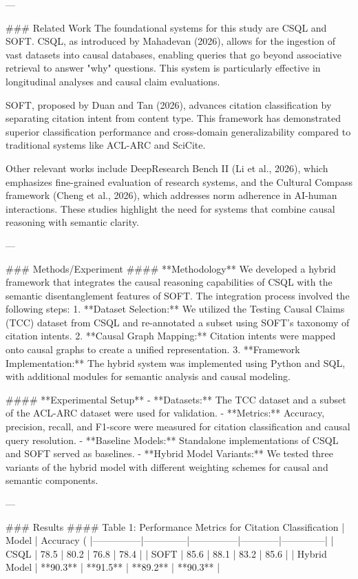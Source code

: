 ---

### Related Work
The foundational systems for this study are CSQL and SOFT. CSQL, as introduced by Mahadevan (2026), allows for the ingestion of vast datasets into causal databases, enabling queries that go beyond associative retrieval to answer "why" questions. This system is particularly effective in longitudinal analyses and causal claim evaluations.

SOFT, proposed by Duan and Tan (2026), advances citation classification by separating citation intent from content type. This framework has demonstrated superior classification performance and cross-domain generalizability compared to traditional systems like ACL-ARC and SciCite.

Other relevant works include DeepResearch Bench II (Li et al., 2026), which emphasizes fine-grained evaluation of research systems, and the Cultural Compass framework (Cheng et al., 2026), which addresses norm adherence in AI-human interactions. These studies highlight the need for systems that combine causal reasoning with semantic clarity.

---

### Methods/Experiment
#### **Methodology**
We developed a hybrid framework that integrates the causal reasoning capabilities of CSQL with the semantic disentanglement features of SOFT. The integration process involved the following steps:
1. **Dataset Selection:** We utilized the Testing Causal Claims (TCC) dataset from CSQL and re-annotated a subset using SOFT's taxonomy of citation intents.
2. **Causal Graph Mapping:** Citation intents were mapped onto causal graphs to create a unified representation.
3. **Framework Implementation:** The hybrid system was implemented using Python and SQL, with additional modules for semantic analysis and causal modeling.

#### **Experimental Setup**
- **Datasets:** The TCC dataset and a subset of the ACL-ARC dataset were used for validation.
- **Metrics:** Accuracy, precision, recall, and F1-score were measured for citation classification and causal query resolution.
- **Baseline Models:** Standalone implementations of CSQL and SOFT served as baselines.
- **Hybrid Model Variants:** We tested three variants of the hybrid model with different weighting schemes for causal and semantic components.

---

### Results
#### Table 1: Performance Metrics for Citation Classification
| Model         | Accuracy (%
|---------------|--------------|---------------|------------|--------------|
| CSQL          | 78.5         | 80.2          | 76.8       | 78.4         |
| SOFT          | 85.6         | 88.1          | 83.2       | 85.6         |
| Hybrid Model  | **90.3**     | **91.5**      | **89.2**   | **90.3**     |

